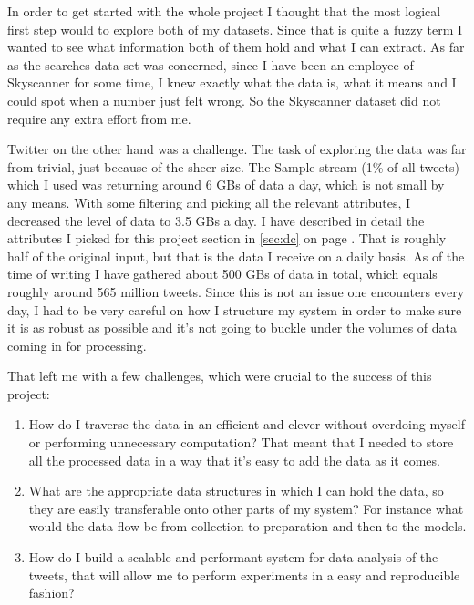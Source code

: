 \documentclass[minf,frontabs,twoside,singlespacing,parskip]{infthesis}
\begin{document}
In order to get started with the whole project I thought that the most logical first step would to explore both of my datasets. Since that is quite a fuzzy term I wanted to see what information both of them hold and what I can extract. As far as the searches data set was concerned, since I have been an employee of Skyscanner for some time, I knew exactly what the data is, what it means and I could spot when a number just felt wrong. So the Skyscanner dataset did not require any extra effort from me. 


Twitter on the other hand was a challenge. The task of exploring the data was far from trivial, just because of the sheer size. The Sample stream (1\% of all tweets) which I used \cite{samplestream} was returning around 6 GBs of data a day, which is not small by any means. With some filtering and picking all the relevant attributes, I decreased the level of data to 3.5 GBs a day. I have described in detail the attributes I picked for this project section in \ref{sec:dc} on page \pageref{sec:dc}. That is roughly half of the original input, but that is the data I receive on a daily basis. As of the time of writing I have gathered about 500 GBs of data in total, which equals roughly around 565 million tweets. Since this is not an issue one encounters every day, I had to be very careful on how I structure my system in order to make sure it is as robust as possible and it's not going to buckle under the volumes of data coming in for processing. 


That left me with a few challenges, which were crucial to the success of this project:
\begin{enumerate}
\item How do I traverse the data in an efficient and clever without overdoing myself or performing unnecessary computation? That meant that I needed to store all the processed data in a way that it's easy to add the data as it comes.
\item What are the appropriate data structures in which I can hold the data, so they are easily transferable onto other parts of my system? For instance what would the data flow be from collection to preparation and then to the models.
\item How do I build a scalable and performant system for data analysis of the tweets, that will allow me to perform experiments in a easy and reproducible fashion?
\end{enumerate}
\end{document}
